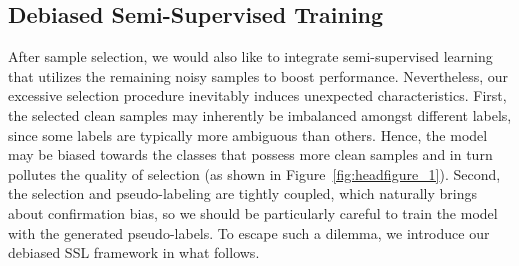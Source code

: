 \documentclass{article}
\begin{document}
    \subsection{Debiased Semi-Supervised Training}
After sample selection, we would also like to integrate semi-supervised learning that utilizes the remaining noisy samples to boost performance. Nevertheless, our excessive selection procedure inevitably induces unexpected characteristics. 
First, the selected clean samples may inherently be imbalanced amongst different labels, since some labels are typically more ambiguous than others. Hence, the model may be biased towards the classes that possess more clean samples and in turn pollutes the quality of selection (as shown in Figure~\ref{fig:headfigure_1}).
Second, the selection and pseudo-labeling are tightly coupled, which naturally brings about confirmation bias, so we should be particularly careful to train the model with the generated pseudo-labels. 
To escape such a dilemma, we introduce our debiased SSL framework in what follows.          
\end{document}
